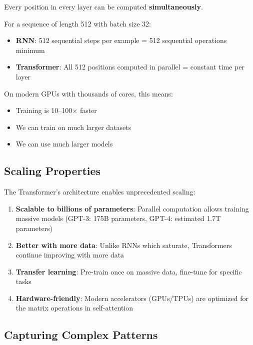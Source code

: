 \documentclass{article}
\begin{document}
\begin{tcolorbox}[colback=green!5!white, colframe=green!50!black, title=Parallel Training]
Every position in every layer can be computed \textbf{simultaneously}.

For a sequence of length 512 with batch size 32:
\begin{itemize}
\item \textbf{RNN}: 512 sequential steps per example = 512 sequential operations minimum
\item \textbf{Transformer}: All 512 positions computed in parallel = constant time per layer
\end{itemize}

On modern GPUs with thousands of cores, this means:
\begin{itemize}
\item Training is 10--100$\times$ faster
\item We can train on much larger datasets
\item We can use much larger models
\end{itemize}
\end{tcolorbox}

\subsection{Scaling Properties}

The Transformer's architecture enables unprecedented scaling:

\begin{enumerate}
\item \textbf{Scalable to billions of parameters}: Parallel computation allows training massive models (GPT-3: 175B parameters, GPT-4: estimated 1.7T parameters)

\item \textbf{Better with more data}: Unlike RNNs which saturate, Transformers continue improving with more data

\item \textbf{Transfer learning}: Pre-train once on massive data, fine-tune for specific tasks

\item \textbf{Hardware-friendly}: Modern accelerators (GPUs/TPUs) are optimized for the matrix operations in self-attention
\end{enumerate}

\subsection{Capturing Complex Patterns}
\end{document}
